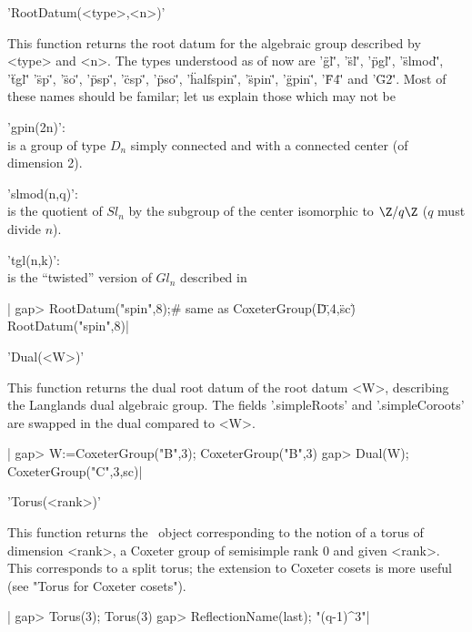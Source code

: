 
'RootDatum(<type>,<n>)'

This  function returns the root datum  for the algebraic group described by
<type>  and <n>. The  types understood as  of now are\: '\"gl\"', '\"sl\"',
'\"pgl\"', '\"slmod\"', '\"tgl\"' '\"sp\"', '\"so\"', '\"psp\"', '\"csp\"',
'\"pso\"', '\"halfspin\"', '\"spin\"', '\"gpin\"', '\"F4\"' and '\"G2\"'.
Most of these names should be familar; let us explain those which may not be\:

'gpin(2n)':\\ is a group of type $D_n$ simply connected and with a connected
   center (of dimension 2).

'slmod(n,q)':\\ is the quotient of $Sl_n$ by the subgroup of the center
   isomorphic to $\Z/q\Z$ ($q$ must divide $n$).

'tgl(n,k)':\\ is the ``twisted'' version of $Gl_n$ described in 
   \cite[Example 5.17]{tay19}

|    gap> RootDatum("spin",8);# same as CoxeterGroup(\"D\",4,\"sc\")
    RootDatum("spin",8)|


'Dual(<W>)'

This function returns the dual root datum of the root datum <W>, describing
the   Langlands  dual  algebraic  group.   The  fields  '.simpleRoots'  and
'.simpleCoroots' are swapped in the dual compared to <W>.

|    gap> W:=CoxeterGroup("B",3);
    CoxeterGroup("B",3)
    gap> Dual(W);
    CoxeterGroup("C",3,sc)|


'Torus(<rank>)'

This  function returns the \CHEVIE\ object corresponding to the notion of a
torus  of dimension <rank>, a Coxeter group  of semisimple rank 0 and given
<rank>.  This corresponds to a split torus; the extension to Coxeter cosets
is more useful (see "Torus for Coxeter cosets").

|    gap> Torus(3);
    Torus(3)
    gap> ReflectionName(last);
    "(q-1)^3"|


